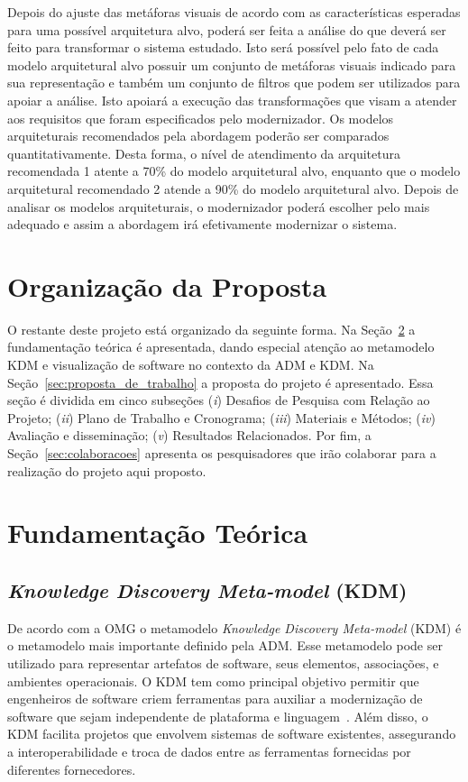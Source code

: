 \documentclass[12pt]{article}
\begin{document}
Depois do ajuste das metáforas visuais de acordo com as características esperadas para uma possível arquitetura alvo, poderá ser feita a análise do que deverá ser feito para transformar o sistema estudado. Isto será possível pelo fato de cada modelo arquitetural alvo possuir um conjunto de metáforas visuais indicado para sua representação e também um conjunto de filtros que podem ser utilizados para apoiar a análise. Isto apoiará a execução das transformações que visam a atender aos requisitos que foram especificados pelo modernizador. Os modelos arquiteturais recomendados pela abordagem poderão ser comparados quantitativamente. Desta forma, o nível de atendimento da arquitetura recomendada 1 atente a 70\% do modelo arquitetural alvo, enquanto que o modelo arquitetural recomendado 2 atende a 90\% do modelo arquitetural alvo. Depois de analisar os modelos arquiteturais, o modernizador poderá escolher pelo mais adequado e assim a abordagem irá efetivamente modernizar o sistema. 

\section{Organização da Proposta}

O restante deste projeto está organizado da seguinte forma. Na Seção~\ref{sec:fundamentacao_teorica} a fundamentação teórica é apresentada, dando especial atenção ao metamodelo KDM e visualização de software no contexto da ADM e KDM. Na Seção~\ref{sec:proposta_de_trabalho} a proposta do projeto é apresentado. Essa seção é dividida em cinco subseções (\textit{i}) Desafios de Pesquisa com Relação ao Projeto; (\textit{ii}) Plano de Trabalho e Cronograma; (\textit{iii}) Materiais e Métodos; (\textit{iv}) Avaliação e disseminação; (\textit{v}) Resultados Relacionados. Por fim, a Seção~\ref{sec:colaboracoes} apresenta os pesquisadores que irão colaborar para a realização do projeto aqui proposto.

\section{Fundamentação Teórica}\label{sec:fundamentacao_teorica}

\subsection{\textit{Knowledge Discovery Meta-model} (KDM)}

De acordo com a OMG o metamodelo \textit{Knowledge Discovery Meta-model} (KDM) é o metamodelo mais importante definido pela ADM. Esse metamodelo pode ser utilizado para representar artefatos de software, seus elementos, associações, e ambientes operacionais. O KDM tem como principal objetivo permitir que engenheiros de software criem ferramentas para auxiliar a modernização de software que sejam independente de plataforma e linguagem~\cite{PerezCastillo:2011jo, ADMCHAPTERR}. Além disso, o KDM facilita projetos que envolvem sistemas de software existentes, assegurando a interoperabilidade e troca de dados entre as ferramentas fornecidas por diferentes fornecedores. 
\end{document}
